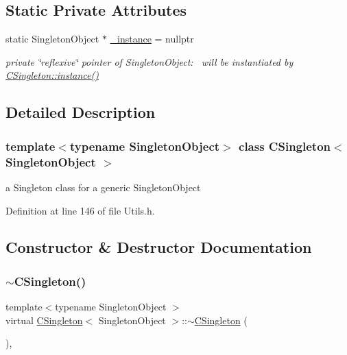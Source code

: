 \subsection*{Static Private Attributes}
\begin{DoxyCompactItemize}
\item 
static Singleton\+Object $\ast$ \hyperlink{classCSingleton_a690e0816be5d469e60d074cf8c5d139c}{\+\_\+instance} = nullptr
\begin{DoxyCompactList}\small\item\em private \char`\"{}reflexive\char`\"{} pointer of Singleton\+Object\+:~\newline
 will be instantiated by \hyperlink{classCSingleton_a58f5ac3aaaea8079a373350594726bdf}{C\+Singleton\+::instance()} \end{DoxyCompactList}\end{DoxyCompactItemize}


\subsection{Detailed Description}
\subsubsection*{template$<$typename Singleton\+Object$>$\newline
class C\+Singleton$<$ Singleton\+Object $>$}

a Singleton class for a generic Singleton\+Object 

Definition at line 146 of file Utils.\+h.



\subsection{Constructor \& Destructor Documentation}
\mbox{\label{classCSingleton_ad790e6c170b3e2da7fbb10873eeb882e}} 
\subsubsection{\texorpdfstring{$\sim$\+C\+Singleton()}{~CSingleton()}}
{\footnotesize\ttfamily template$<$typename Singleton\+Object $>$ \\
virtual \hyperlink{classCSingleton}{C\+Singleton}$<$ Singleton\+Object $>$\+::$\sim$\hyperlink{classCSingleton}{C\+Singleton} (\begin{DoxyParamCaption}{ }\end{DoxyParamCaption})\hspace{0.3cm}{\ttfamily [inline]}, {\ttfamily [virtual]}}



